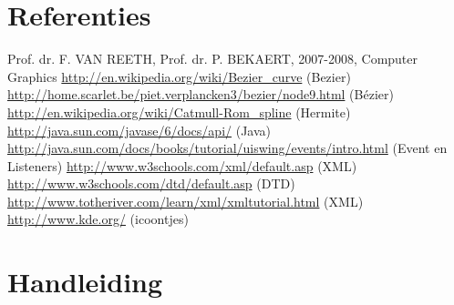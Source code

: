 \documentclass[a4paper,11pt,oneside, titlepage]{article}
\begin{document}
\section{Referenties}
Prof. dr. F. VAN REETH, Prof. dr. P. BEKAERT, 2007-2008, Computer Graphics\newline
\url{http://en.wikipedia.org/wiki/Bezier\_curve} (Bezier)\newline
\url{http://home.scarlet.be/piet.verplancken3/bezier/node9.html} (B\'ezier)\newline
\url{http://en.wikipedia.org/wiki/Catmull-Rom\_spline} (Hermite)\newline
\url{http://java.sun.com/javase/6/docs/api/} (Java)\newline
\url{http://java.sun.com/docs/books/tutorial/uiswing/events/intro.html} (Event en Listeners)\newline
\url{http://www.w3schools.com/xml/default.asp} (XML)\newline
\url{http://www.w3schools.com/dtd/default.asp} (DTD)\newline
\url{http://www.totheriver.com/learn/xml/xmltutorial.html} (XML)\newline
\url{http://www.kde.org/} (icoontjes)\newline
\section{Handleiding}
\newpage
\end{document}
